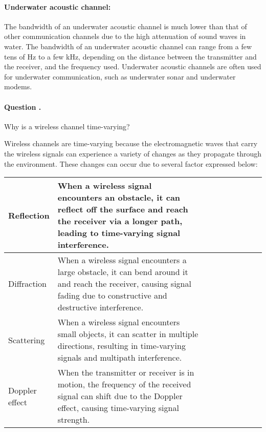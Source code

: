 \documentclass[14pt,a4paper]{report}
\newcounter{question}
\newcommand*\question{%
\stepcounter{question}%
\paragraph{Question \thesection.\thequestion}}
\begin{document}
\begin{answer_box*}
\paragraph{Underwater acoustic channel:}

The bandwidth of an underwater acoustic channel is much lower than that of other communication channels due to the high attenuation of sound waves in water. The bandwidth of an underwater acoustic channel can range from a few tens of Hz to a few kHz, depending on the distance between the transmitter and the receiver, and the frequency used. Underwater acoustic channels are often used for underwater communication, such as underwater sonar and underwater modems.

\end{answer_box*}

\question
{
    Why is a wireless channel time-varying?
}
\begin{answer_box*}

    Wireless channels are time-varying because the electromagnetic waves that carry the wireless signals can experience a variety of changes as they propagate through the environment. These changes can occur due to several factor expressed below: \\

    \begin{tabular}{|l|p{0.7\linewidth}|p{0.3\linewidth}|}
            \hline
            Reflection & When a wireless signal encounters an obstacle, it can reflect off the surface and reach the receiver via a longer path, leading to time-varying signal interference. \\
            \hline
            Diffraction & When a wireless signal encounters a large obstacle, it can bend around it and reach the receiver, causing signal fading due to constructive and destructive interference. \\
            \hline
            Scattering & When a wireless signal encounters small objects, it can scatter in multiple directions, resulting in time-varying signals and multipath interference. \\
            \hline
            Doppler effect & When the transmitter or receiver is in motion, the frequency of the received signal can shift due to the Doppler effect, causing time-varying signal strength. \\
            \hline
    \end{tabular}

\end{answer_box*}
\end{document}
